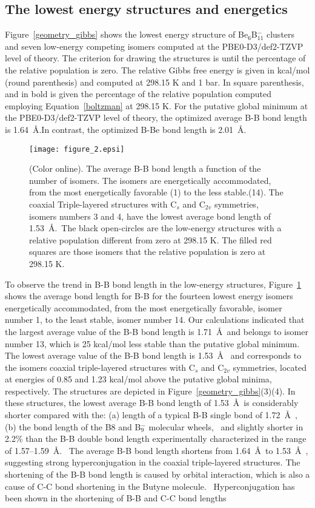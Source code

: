 \documentclass[prb,aps,preprint,showkeys,showpacs]{revtex4}
\begin{document}
\subsection{The lowest energy structures and energetics}
Figure~\ref{geometry_gibbs} shows the lowest energy structure of Be$_6$B${^{-}_{11}}$ clusters and seven low-energy competing isomers computed at the PBE0-D3/def2-TZVP level of theory. The criterion for drawing the structures is until the percentage of the relative population is zero. The relative Gibbs free energy is given in kcal/mol (round parenthesis) and computed at 298.15 K and 1 bar. In square parenthesis, and in  bold is given the percentage of the relative population computed employing Equation~\ref{boltzman} at 298.15 K. For the putative global minimum at the PBE0-D3/def2-TZVP level of theory, the optimized average B-B bond length is 1.64~\AA.In contrast, the optimized B-Be bond length is 2.01~\AA.
\begin{figure}[ht!]
\begin{center}  
\texttt{[image: figure\_2.epsi]}
\caption{(Color online). The average B-B bond length a function of the number of isomers. The isomers are energetically accommodated, from the most energetically favorable (1) to the less stable.(14). The coaxial Triple-layered structures with C$_s$ and C$_{2v}$ symmetries, isomers numbers 3 and 4, have the lowest average bond length of 1.53~\AA.~The black open-circles are the low-energy structures with a relative population different from zero at 298.15 K. The filled red squares are those isomers that the relative population is zero at 298.15 K.}
\label{lboro}
\end{center}
\end{figure}
To observe the trend in B-B bond length in the low-energy structures, Figure~\ref{lboro} shows the average bond length for B-B for the fourteen lowest energy isomers energetically accommodated, from the most energetically favorable, isomer number 1, to the least stable, isomer number 14. Our calculations indicated that the largest average value of the B-B bond length is 1.71~\AA~and belongs to isomer number 13, which is 25 kcal/mol less stable than the putative global minimum. The lowest average value of the B-B bond length is 1.53~\AA~ and corresponds to the isomers coaxial triple-layered structures with C$_s$ and C$_{2v}$ symmetries, located at energies of 0.85 and 1.23 kcal/mol above the putative global minima, respectively. The structures are depicted in Figure~\ref{geometry_gibbs}(3)(4). In these structures, the lowest average B-B bond length of 1.53~\AA~is considerably shorter compared with the: (a) length of a typical B-B single bond of 1.72~\AA~\cite{Shoji}, (b) the bond length of the B8 and B$_9^{-}$ molecular wheels,~\cite{Birch,Guo} and slightly shorter in 2.2{\%} than the B-B double bond length experimentally characterized in the range of 1.57–1.59~\AA.~\cite{Moezzi,Zhou} The average B-B bond length shortens from 1.64~\AA~to 1.53~\AA~, suggesting strong hyperconjugation in the coaxial triple-layered structures. The shortening of the B-B bond length is caused by orbital interaction, which is also a cause of C-C bond shortening in the Butyne molecule.~\cite{Feixas} Hyperconjugation has been shown in the shortening of B-B and C-C bond lengths~\cite{Szabo,Feixas}
\end{document}

